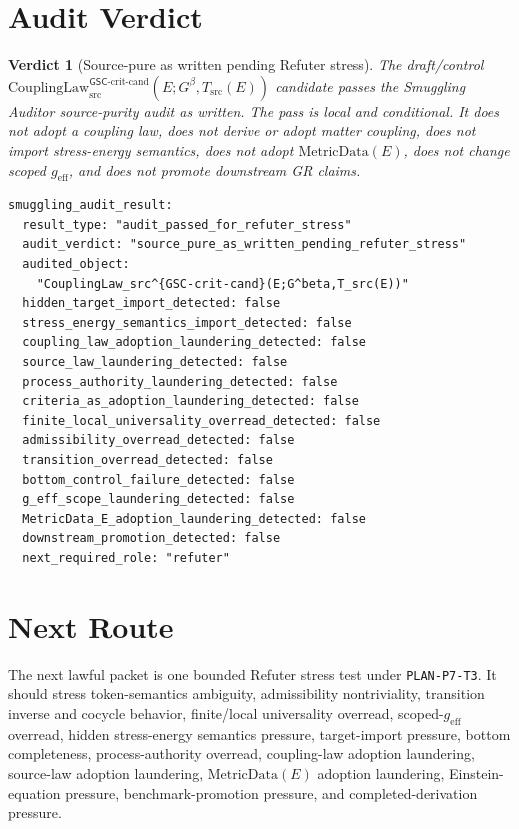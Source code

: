 \documentclass[11pt]{article}
\newcommand{\Gbeta}{G^\beta}
\newcommand{\geff}{g_{\mathrm{eff}}}
\newcommand{\CouplingLawCrit}{\mathrm{CouplingLaw}^{\mathsf{GSC}\mbox{-}\mathrm{crit}\mbox{-}\mathrm{cand}}_{\mathrm{src}}}
\newcommand{\MetricData}{\mathrm{MetricData}}
\newtheorem{verdict}{Verdict}
\begin{document}
\section{Audit Verdict}

\begin{verdict}[Source-pure as written pending Refuter stress]
The draft/control
\(\CouplingLawCrit(E;\Gbeta,T_{\mathrm{src}}(E))\) candidate passes the
Smuggling Auditor source-purity audit as written. The pass is local and
conditional. It does not adopt a coupling law, does not derive or adopt matter
coupling, does not import stress-energy semantics, does not adopt
\(\MetricData(E)\), does not change scoped \(\geff\), and does not promote
downstream GR claims.
\end{verdict}

\begin{verbatim}
smuggling_audit_result:
  result_type: "audit_passed_for_refuter_stress"
  audit_verdict: "source_pure_as_written_pending_refuter_stress"
  audited_object:
    "CouplingLaw_src^{GSC-crit-cand}(E;G^beta,T_src(E))"
  hidden_target_import_detected: false
  stress_energy_semantics_import_detected: false
  coupling_law_adoption_laundering_detected: false
  source_law_laundering_detected: false
  process_authority_laundering_detected: false
  criteria_as_adoption_laundering_detected: false
  finite_local_universality_overread_detected: false
  admissibility_overread_detected: false
  transition_overread_detected: false
  bottom_control_failure_detected: false
  g_eff_scope_laundering_detected: false
  MetricData_E_adoption_laundering_detected: false
  downstream_promotion_detected: false
  next_required_role: "refuter"
\end{verbatim}

\section{Next Route}

The next lawful packet is one bounded Refuter stress test under
\texttt{PLAN-P7-T3}. It should stress token-semantics ambiguity,
admissibility nontriviality, transition inverse and cocycle behavior,
finite/local universality overread, scoped-\(\geff\) overread, hidden
stress-energy semantics pressure, target-import pressure, bottom completeness,
process-authority overread, coupling-law adoption laundering, source-law
adoption laundering, \(\MetricData(E)\) adoption laundering,
Einstein-equation pressure, benchmark-promotion pressure, and
completed-derivation pressure.
\end{document}
